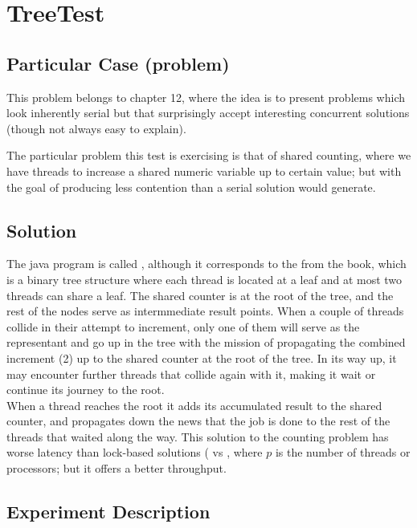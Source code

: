 \section{\textbf{TreeTest}}

\subsection{Particular Case (problem)}
This problem belongs to chapter 12, where the idea is to present
problems which look inherently serial but that surprisingly accept
interesting concurrent solutions (though not always easy to explain).

The particular problem this test is exercising is that of shared
counting, where we have  threads to increase a shared numeric
variable up to certain value; but with the goal of producing less
contention than a serial solution would generate. 

\subsection{Solution}

The java program is called , although it corresponds to  
the  from the book, which is a binary tree structure
where each thread is located at a leaf and at most two threads can
share a leaf. The shared counter is at the root of the tree, and the
rest of the nodes serve as intermmediate result points. When a couple
of threads collide in their attempt to increment, only one of them
will serve as the representant and go up in the tree with the mission
of propagating the combined increment (2) up to the shared counter at
the root of the tree. In its way up, it may encounter further threads
that collide again with it, making it wait or continue its journey to
the root. \\

When a thread reaches the root it adds its accumulated result to the
shared counter, and propagates down the news that the job is done to
the rest of the threads that waited along the way. This
solution to the counting problem has worse latency than lock-based
solutions ( vs , where $p$ is the number of
threads or processors; but it offers a better throughput. 

\subsection{Experiment Description}

